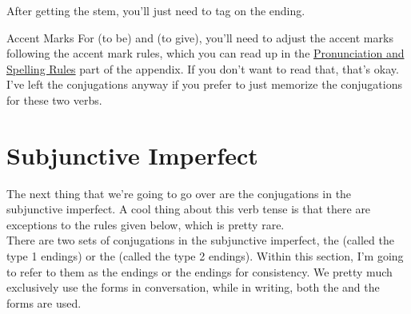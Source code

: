 After getting the stem, you'll just need to tag on the ending. 
\begin{conf}{Accent Marks}
	For  (to be) and  (to give), you'll need to adjust the accent marks following the accent mark rules, which you can read up in the \hyperref[subsec:pronun]{Pronunciation and Spelling Rules} part of the appendix. If you don't want to read that, that's okay. I've left the conjugations anyway if you prefer to just memorize the conjugations for these two verbs.
\end{conf}









\section{Subjunctive Imperfect}

The next thing that we're going to go over are the conjugations in the subjunctive imperfect. A cool thing about this verb tense is that there are  exceptions to the rules given below, which is pretty rare. \\

There are two sets of conjugations in the subjunctive imperfect, the  (called the type 1 endings) or the  (called the type 2 endings). Within this section, I'm going to refer to them as the  endings or the  endings for consistency. We pretty much exclusively use the  forms in conversation, while in writing, both the  and the  forms are used.\\


